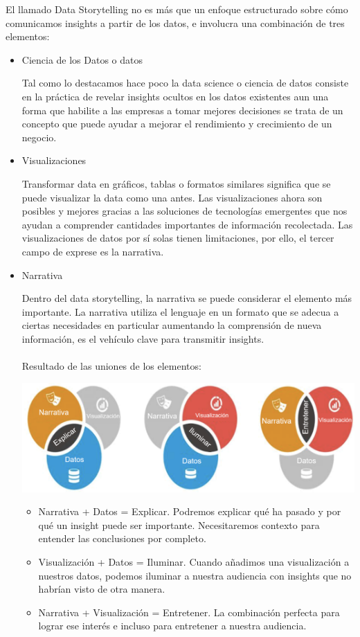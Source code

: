 \documentclass[preprint,12pt]{elsarticle}
\begin{document}
	El llamado Data Storytelling no es más que un enfoque estructurado sobre cómo comunicamos insights a partir de los datos, e involucra una combinación de tres elementos: 
	\begin{itemize}
		\item Ciencia de los Datos o datos
			
		Tal como lo destacamos hace poco la data science o ciencia de datos consiste en la práctica de revelar insights ocultos en los datos existentes aun una forma que habilite a las empresas a tomar mejores decisiones se trata de un concepto que puede ayudar a mejorar el rendimiento y crecimiento de un negocio.
		
		
		\item Visualizaciones
		
		Transformar data en gráficos, tablas o formatos similares significa que se puede visualizar la data como una antes. Las visualizaciones ahora son posibles y mejores gracias a las soluciones de tecnologías emergentes que nos ayudan a comprender cantidades importantes de información recolectada.  Las visualizaciones de datos por sí solas tienen limitaciones, por ello, el tercer campo de exprese es la narrativa.
		
		\item Narrativa
		
		Dentro del data storytelling, la narrativa se puede considerar el elemento más importante. La narrativa utiliza el lenguaje en un formato que se adecua a ciertas necesidades en particular aumentando la comprensión de nueva información, es el vehículo clave para transmitir insights.\\
		\\
		Resultado de las uniones de los elementos:
		
		\begin{center}
			\includegraphics[width=13cm]{./Imagenes/img1} 
		\end{center}
		
			\begin{itemize}
				\item Narrativa + Datos = Explicar. Podremos explicar qué ha pasado y por qué un insight puede ser importante. Necesitaremos contexto para entender las conclusiones por completo.
				\item Visualización + Datos = Iluminar. Cuando añadimos una visualización a nuestros datos, podemos iluminar a nuestra audiencia con insights que no habrían visto de otra manera.
				\item Narrativa + Visualización = Entretener. La combinación perfecta para lograr ese interés e incluso para entretener a nuestra audiencia.
			\end{itemize}

	\end{itemize}
\end{document}
